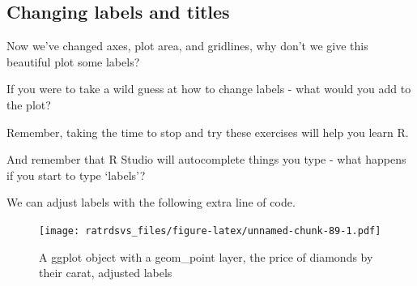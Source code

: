 \documentclass[
]{book}
\newenvironment{Shaded}{\begin{snugshade}}{\end{snugshade}}
\newcommand{\DataTypeTok}[1]{\textcolor[rgb]{0.13,0.29,0.53}{#1}}
\newcommand{\DecValTok}[1]{\textcolor[rgb]{0.00,0.00,0.81}{#1}}
\newcommand{\FloatTok}[1]{\textcolor[rgb]{0.00,0.00,0.81}{#1}}
\newcommand{\KeywordTok}[1]{\textcolor[rgb]{0.13,0.29,0.53}{\textbf{#1}}}
\newcommand{\NormalTok}[1]{#1}
\newcommand{\OperatorTok}[1]{\textcolor[rgb]{0.81,0.36,0.00}{\textbf{#1}}}
\newcommand{\StringTok}[1]{\textcolor[rgb]{0.31,0.60,0.02}{#1}}
\begin{document}
\hypertarget{gg_labs}{%
\subsection{Changing labels and titles}\label{gg_labs}}

Now we've changed axes, plot area, and gridlines, why don't we give this beautiful plot some labels?

\begin{hey}
If you were to take a wild guess at how to change labels - what would
you add to the plot?

Remember, taking the time to stop and try these exercises will help you
learn R.

And remember that R Studio will autocomplete things you type - what
happens if you start to type `labels'?
\end{hey}

We can adjust labels with the following extra line of code.

\begin{Shaded}
\end{Shaded}

\begin{figure}
\centering
\texttt{[image: ratrdsvs\_files/figure-latex/unnamed-chunk-89-1.pdf]}
\caption{\label{fig:unnamed-chunk-89}A ggplot object with a geom\_point layer, the price of diamonds by their carat, adjusted labels}
\end{figure}
\end{document}
